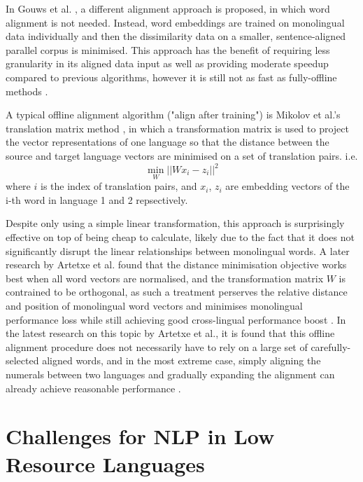 \documentclass[]{article}
\begin{document}
In Gouws et al. \cite{gouws2015bilbowa}, a different alignment approach is proposed, in which word alignment is not needed. Instead, word embeddings are trained on monolingual data individually and then the dissimilarity data on a smaller, sentence-aligned parallel corpus is minimised. This approach has the benefit of requiring less granularity in its aligned data input as well as providing moderate speedup compared to previous algorithms, however it is still not as fast as fully-offline methods \cite{gouws2015bilbowa}.

A typical offline alignment algorithm ("align after training") is Mikolov et al.'s translation matrix method \cite{mikolov2013exploiting}, in which a transformation matrix is used to project the vector representations of one language so that the distance between the source and target language vectors are minimised on a set of translation pairs. i.e.
\[ \min_W || Wx_i - z_i||^2 \] where $i$ is the index of translation pairs, and $x_i$, $z_i$ are embedding vectors of the i-th word in language 1 and 2 repsectively.

Despite only using a simple linear transformation, this approach is surprisingly effective on top of being cheap to calculate, likely due to the fact that it does not significantly disrupt the linear relationships between monolingual words. A later research by Artetxe et al. found that the distance minimisation objective works best when all word vectors are normalised, and the transformation matrix $W$ is contrained to be orthogonal, as such a treatment perserves the relative distance and position of monolingual word vectors and minimises monolingual performance loss while still achieving good cross-lingual performance boost \cite{artetxe2016learning}. In the latest research on this topic by Artetxe et al., it is found that this offline alignment procedure does not necessarily have to rely on a large set of carefully-selected aligned words, and in the most extreme case, simply aligning the numerals between two languages and gradually expanding the alignment can already achieve reasonable performance \cite{artetxe2017learning}.


\section{Challenges for NLP in Low Resource Languages}
\end{document}
